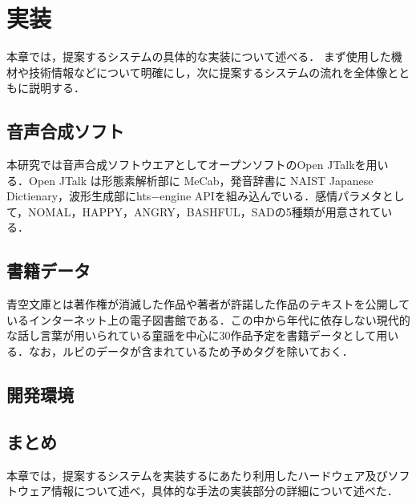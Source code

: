 \chapter{実装}

本章では，提案するシステムの具体的な実装について述べる．
まず使用した機材や技術情報などについて明確にし，次に提案するシステムの流れを全体像とともに説明する．

\section{音声合成ソフト}
本研究では音声合成ソフトウエアとしてオープンソフトのOpen JTalk\cite{jtalk}を用いる．Open JTalk は形態素解析部に MeCab\cite{mecab}，発音辞書に NAIST Japanese Dictienary\cite{dic}，波形生成部にhts−engine API\cite{hmm}を組み込んでいる．感情パラメタとして，NOMAL，HAPPY，ANGRY，BASHFUL，SADの5種類が用意されている．

\section{書籍データ}
青空文庫\cite{aozora}とは著作権が消滅した作品や著者が許諾した作品のテキストを公開しているインターネット上の電子図書館である．この中から年代に依存しない現代的な話し言葉が用いられている童謡を中心に30作品\(予定\)を書籍データとして用いる．なお，ルビのデータが含まれているため予めタグを除いておく．

\section{開発環境}
\section{まとめ}
本章では，提案するシステムを実装するにあたり利用したハードウェア及びソフトウェア情報について述べ，具体的な手法の実装部分の詳細について述べた．

